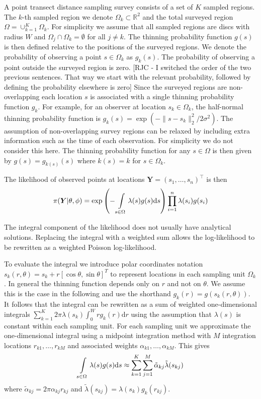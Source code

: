 \documentclass[preprint,12pt]{elsarticle}
\newcommand{\bm}{\boldsymbol}  %
\newcommand{\tl}{\tilde{\lambda}}   %
\begin{document}
A point transect distance sampling survey consists of a set of $K$ sampled regions.  The $k$-th sampled region we denote $\Omega_k \subset \mathbb{R}^2$ and the total surveyed region $\Omega = \cup_{k=1}^K \Omega_k$.  For simplicity we assume that all sampled regions are discs with radius $W$ and $\Omega_j \cap \Omega_k = \emptyset$ for all $j \neq k$.  The thinning probability function $g(s)$ is then defined relative to the positions of the surveyed regions.  We denote the probability of observing a point $s \in \Omega_k$ as $g_k(s)$.  The probability of observing a point outside the surveyed region is zero.  [RJC - I switched the order of the two previous sentences. That way we start with the relevant probability, followed by defining the probability elsewhere is zero]  Since the surveyed regions are non-overlapping each location $s$ is associated with a single thinning probability function $g_k$.  For example, for an observer at location $s_k \in \Omega_k$, the half-normal thinning probability function is $g_k(s) = \exp(-\lVert s - s_k \rVert_2^2 / 2\sigma^2)$. The assumption of non-overlapping survey regions can be relaxed by including extra information such as the time of each observation.  For simplicity we do not consider this here.  The thinning probability function for any $s \in \Omega$ is then given by $g(s) = g_{k(s)}(s)$ where $k(s) = k$ for $s \in \Omega_k$.

The likelihood of observed points at locations $\bm{Y} = (s_1, \ldots, s_n)^\intercal$ is then
\begin{equation}
\label{lgcp-likelihood}
\pi(\bm{Y} | \theta, \phi) = \exp\left(-\int\displaylimits_{s \in \Omega} \lambda(s) g(s) \mathrm{d}s \right)\prod_{i=1}^n \lambda(s_i)g(s_i)
\end{equation}

The integral component of the likelihood does not usually have analytical solutions.  Replacing the integral with a weighted sum allows the log-likelihood to be rewritten as a weighted Poisson log-likelihood.

To evaluate the integral we introduce polar coordinates notation $s_k(r, \theta) = s_k + r\left[\cos\theta, \sin\theta \right]^T$ to represent locations in each sampling unit $\Omega_k$.   In general the thinning function depends only on $r$ and not on $\theta$.  We assume this is the case in the following and use the shorthand $g_k(r) = g(s_k(r, \theta))$. It follows that the integral can be rewritten as a sum of weighted one-dimensional integrals $\sum_{k=1}^K 2\pi \lambda(s_k) \int_0^W r g_k(r)\mathrm{d}r$ using the assumption that $\lambda(s)$ is constant within each sampling unit.  For each sampling unit we approximate the one-dimensional integral using a midpoint integration method with $M$ integration locations $r_{k1}, \ldots, r_{kM}$ and associated weights $\alpha_{k1}, \ldots, \alpha_{kM}$.  This gives
\begin{equation*}
	\int\displaylimits_{s \in \Omega} \lambda(s)g(s)\mathrm{d}s \approx \sum_{k=1}^K \sum_{j=1}^M \tilde{\alpha}_{kj} \tl(s_{kj})
\end{equation*}
where $\tilde{\alpha}_{kj} = 2\pi \alpha_{kj}r_{kj}$ and $\tl(s_{kj}) = \lambda(s_k) g_k(r_{kj})$.
\end{document}
